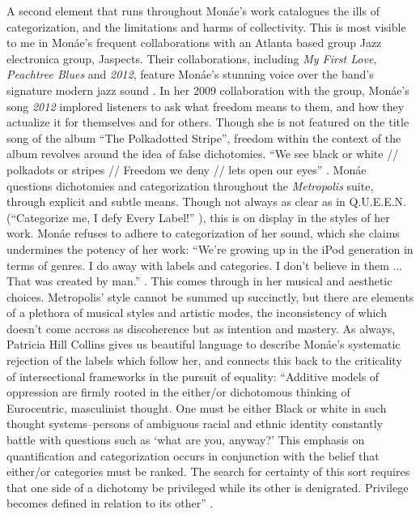 \documentclass[a4paper, 11pt]{article} %
\begin{document}
A second element that runs throughout Mon\'ae's work catalogues the ills of categorization, and the limitations and harms of collectivity.
This is most visible to me in Mon\'ae's frequent collaborations with an Atlanta based group Jazz electronica group, Jaspects.
Their collaborations, including \emph{My First Love}, \emph{Peachtree Blues} and \emph{2012}, feature Mon\'ae's stunning voice over the band's signature modern jazz sound \cite{peachtreeblues} \cite{myfirstlove}.
In her 2009 collaboration with the group, Mon\'ae's song \emph{2012} implored listeners to ask what freedom means to them, and how they actualize it for themselves and for others.
Though she is not featured on the title song of the album ``The Polkadotted Stripe'', freedom within the context of the album revolves around the idea of false dichotomies.
``We see black or white // polkadots or stripes // Freedom we deny // lets open our eyes'' \cite{polkadottedstripe}.
Mon\'ae questions dichotomies and categorization throughout the \emph{Metropolis} suite, through explicit and subtle means.
Though not always as clear as in Q.U.E.E.N. (``Categorize me, I defy Every Label!'' \cite{queen}), 
this is on display in the styles of her work.
Mon\'ae refuses to adhere to categorization of her sound, which she claims undermines the potency of her work:
``We're growing up in the iPod generation in terms of genres. I do away with labels and categories. I don't believe in them ... That was created by man.'' \cite{joeyguerra2010}.
This comes through in her musical and aesthetic choices.
Metropolis' style cannot be summed up succinctly, but there are elements of a plethora of musical styles and artistic modes, the inconsistency of which doesn't come accross as discoherence but as intention and mastery.
As always, Patricia Hill Collins gives us beautiful language to describe Mon\'ae's systematic rejection of the labels which follow her, and connects this back to the criticality of intersectional frameworks in the pursuit of equality: ``Additive models of oppression are firmly rooted in the either/or dichotomous thinking of Eurocentric, masculinist thought. One must be either Black or white in such thought systems--persons of ambiguous racial and ethnic identity constantly battle with questions such as `what are you, anyway?' This emphasis on quantification and categorization occurs in conjunction with the belief that either/or categories must be ranked. The search for certainty of this sort requires that one side of a dichotomy be privileged while its other is denigrated. Privilege becomes defined in relation to its other'' \cite{collins2009}.
\end{document}
